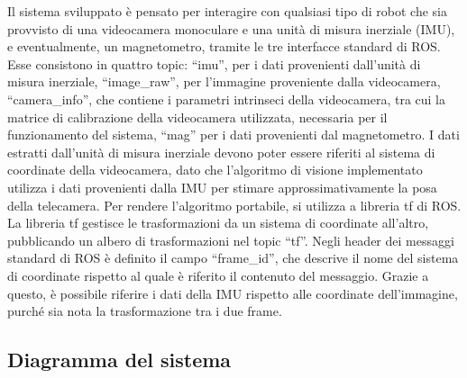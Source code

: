 Il sistema sviluppato è pensato per interagire con qualsiasi tipo di robot che sia provvisto di una videocamera monoculare e una unità di misura inerziale (IMU), e eventualmente, un magnetometro, tramite le tre interfacce standard di ROS.
Esse consistono in quattro topic: ``imu'', per i dati provenienti dall'unità di misura inerziale, ``image\_raw'', per l'immagine proveniente dalla videocamera, ``camera\_info'', che contiene i parametri intrinseci della videocamera, tra cui la matrice di calibrazione della videocamera utilizzata, necessaria per il funzionamento del sistema, ``mag'' per i dati provenienti dal magnetometro.
I dati estratti dall'unità di misura inerziale devono poter essere riferiti al sistema di coordinate della videocamera, dato che l'algoritmo di visione implementato utilizza i dati provenienti dalla IMU per stimare approssimativamente la posa della telecamera.
Per rendere l'algoritmo portabile, si utilizza a libreria tf di ROS. La libreria tf gestisce le trasformazioni da un sistema di coordinate all'altro, pubblicando un albero di trasformazioni nel topic ``tf''.
Negli header dei messaggi standard di ROS è definito il campo ``frame\_id'', che descrive il nome del sistema di coordinate rispetto al quale è riferito il contenuto del messaggio. Grazie a questo, è possibile riferire i dati della IMU rispetto alle coordinate dell'immagine, purché sia nota la trasformazione tra i due frame.

\subsection{Diagramma del sistema}

